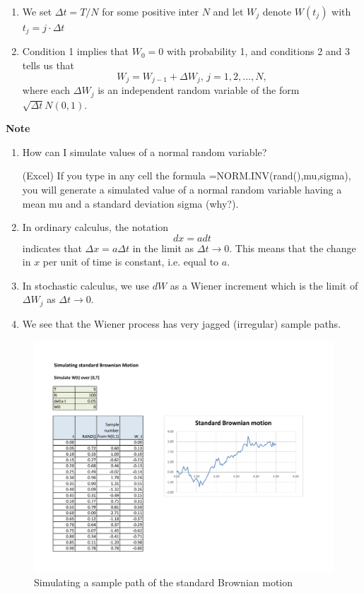 \documentclass[
]{book}
\theoremstyle{definition}
\theoremstyle{definition}
\theoremstyle{definition}
\theoremstyle{definition}
\theoremstyle{remark}
\begin{document}
\begin{enumerate}
\def\labelenumi{\arabic{enumi}.}
\item
  We set \(\Delta t = T/N\) for some positive inter \(N\) and let \(W_j\)
  denote \(W(t_j)\) with \(t_j = j \cdot \Delta t\)
\item
  Condition 1 implies that \(W_0 = 0\) with probability 1, and
  conditions 2 and 3 tells us that
  \[W_j = W_{j-1} + \Delta W_j, \, j = 1,2, \ldots, N,\] where each
  \(\Delta W_j\) is an independent random variable of the form
  \(\sqrt{\Delta t} N(0,1)\).
\end{enumerate}

\textbf{Note}

\begin{enumerate}
\def\labelenumi{\arabic{enumi}.}
\item
  How can I simulate values of a normal random variable?

  (Excel) If you type in any cell the formula
  =NORM.INV(rand(),mu,sigma), you will generate a simulated value of a
  normal random variable having a mean mu and a standard deviation
  sigma (why?).
\item
  In ordinary calculus, the notation \[dx = a dt\] indicates that
  \(\Delta x = a \Delta t\) in the limit as \(\Delta t \rightarrow 0\).
  This means that the change in \(x\) per unit of time is constant, i.e.
  equal to \(a\).
\item
  In stochastic calculus, we use \(dW\) as a Wiener increment which is
  the limit of \(\Delta W_j\) as \(\Delta t \rightarrow 0\).
\item
  We see that the Wiener process has very jagged (irregular) sample
  paths.
\end{enumerate}

\begin{figure}
\hypertarget{fig:BM}{%
\centering
\includegraphics[width=8in,height=\textheight]{BM.pdf}
\caption{Simulating a sample path of the standard Brownian
motion}\label{fig:BM}
}
\end{figure}
\end{document}
